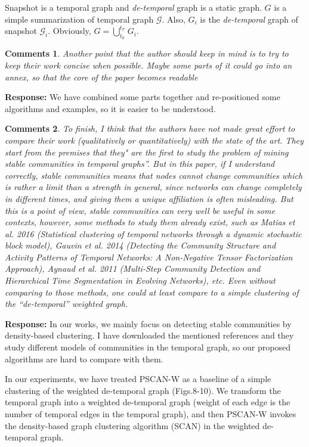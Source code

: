 \documentclass{article}
\newtheorem{Comments}{\textbf{Comments}}
\begin{document}
Snapshot is a temporal graph and \emph{de-temporal} graph is a static graph.
$G$ is a simple summarization of temporal graph $\mathcal G$. 
Also, $G_i$  is the \emph{de-temporal} graph of snapshot $\mathcal G_i$.
Obviously, $G = \bigcup_{t_0}^{t_{\mathcal{T}} }G_i$.

\begin{Comments}
Another point that the author should keep in mind is to try to keep their work concise when possible. Maybe some parts of it could go into an annex, so that the core of the paper becomes readable
\end{Comments}
\noindent \textbf{Response: }We have combined some parts together and re-positioned some algorithms and examples, so it is easier to be understood. 

\begin{Comments}

To finish, I think that the authors have not made great effort to compare their work (qualitatively or quantitatively) with the state of the art. They start from the premises that they" are the first to study the problem of mining stable communities in temporal graphs”. But in this paper, if I understand correctly, stable communities means that nodes cannot change communities which is rather a limit than a strength in general, since networks can change completely in different times, and giving them a unique affiliation is often misleading. But this is a point of view, stable communities can very well be useful in some contexts, however, some methods to study them already exist, such as Matias et al. 2016 (Statistical clustering of temporal networks through a dynamic stochastic block model), Gauvin et al.  2014 (Detecting the Community Structure and Activity Patterns of Temporal Networks: A Non-Negative Tensor Factorization Approach), Aynaud et al. 2011 (Multi-Step Community Detection and Hierarchical Time Segmentation in Evolving Networks), etc.
Even without comparing to those methods, one could at least compare to a simple clustering of the “de-temporal” weighted graph.
\end{Comments}
\noindent \textbf{Response: } In our works, we mainly focus on detecting stable communities by density-based clustering. I have downloaded the mentioned references and they study different models of communities in the temporal graph, so our proposed algorithms are hard to compare with them.

In our experiments, we have treated PSCAN-W as a baseline of a simple clustering of the weighted de-temporal graph (Figs.8-10). We transform the temporal graph into a weighted de-temporal graph (weight of each edge is the number of temporal edges in the temporal graph), and then PSCAN-W invokes the density-based graph clustering algorithm (SCAN) in the weighted de-temporal graph. 
\end{document}
